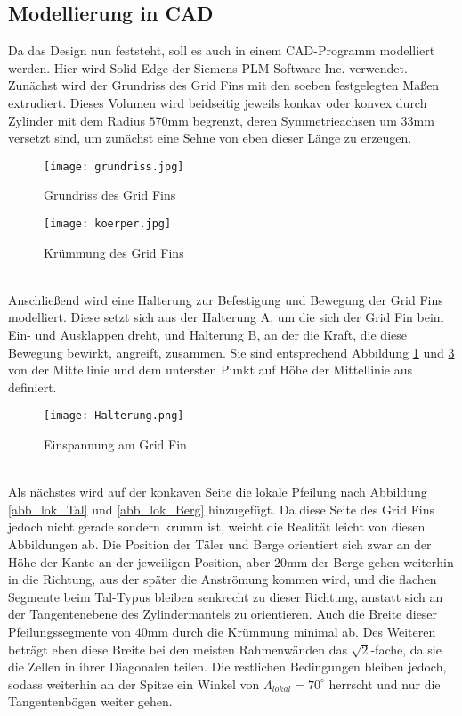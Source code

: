 \subsection{Modellierung in CAD}
Da das Design nun feststeht, soll es auch in einem CAD-Programm modelliert werden. Hier wird Solid Edge der Siemens PLM Software Inc. verwendet. Zunächst wird der Grundriss des Grid Fins mit den soeben festgelegten Maßen extrudiert. Dieses Volumen wird beidseitig jeweils konkav oder konvex durch Zylinder mit dem Radius $570$mm begrenzt, deren Symmetrieachsen um $33$mm versetzt sind, um zunächst eine Sehne von eben dieser Länge zu erzeugen.
\begin{figure}[h]
	\centering
	\texttt{[image: grundriss.jpg]}
	\caption{Grundriss des Grid Fins}
	\label{abb_grundriss}
\end{figure}
\begin{figure}[h]
\centering
\texttt{[image: koerper.jpg]}
\caption{Krümmung des Grid Fins}
\label{abb_körper}
\end{figure}\\
Anschließend wird eine Halterung zur Befestigung und Bewegung der Grid Fins modelliert. Diese setzt sich aus der Halterung A, um die sich der Grid Fin beim Ein- und Ausklappen dreht, und Halterung B, an der die Kraft, die diese Bewegung bewirkt, angreift, zusammen. Sie sind entsprechend Abbildung \ref{abb_grundriss} und \ref{abb_halterung} von der Mittellinie und dem untersten Punkt auf Höhe der Mittellinie aus definiert.
\begin{figure}[h]
	\centering
	\texttt{[image: Halterung.png]}
	\caption{Einspannung am Grid Fin}
	\label{abb_halterung}
\end{figure}\\
Als nächstes wird auf der konkaven Seite die lokale Pfeilung nach Abbildung \ref{abb_lok_Tal} und \ref{abb_lok_Berg} hinzugefügt. Da diese Seite des Grid Fins jedoch nicht gerade sondern krumm ist, weicht die Realität leicht von diesen Abbildungen ab. Die Position der Täler und Berge orientiert sich zwar an der Höhe der Kante an der jeweiligen Position, aber $20$mm der Berge gehen weiterhin in die Richtung, aus der später die Anströmung kommen wird, und die flachen Segmente beim Tal-Typus bleiben senkrecht zu dieser Richtung, anstatt sich an der Tangentenebene des Zylindermantels zu orientieren. Auch die Breite dieser Pfeilungssegmente von $40$mm durch die Krümmung minimal ab. Des Weiteren beträgt eben diese Breite bei den meisten Rahmenwänden das $\sqrt{2}$-fache, da sie die Zellen in ihrer Diagonalen teilen. Die restlichen Bedingungen bleiben jedoch, sodass weiterhin an der Spitze ein Winkel von $\Lambda_{lokal} = 70^\circ$ herrscht und nur die Tangentenbögen weiter gehen.


